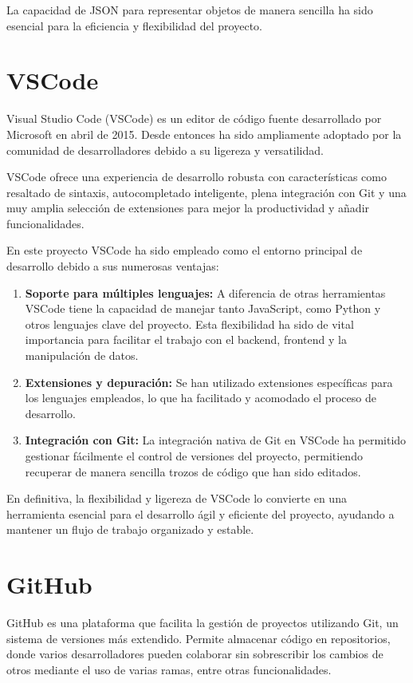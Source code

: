 \documentclass[a4paper, 12pt]{book}
\begin{document}
La capacidad de JSON para representar objetos de manera sencilla ha sido esencial para la eficiencia y flexibilidad del proyecto.

\section{VSCode}
Visual Studio Code (VSCode) es un editor de código fuente desarrollado por Microsoft en abril de 2015. Desde entonces ha sido ampliamente adoptado por la comunidad de desarrolladores debido a su ligereza y versatilidad.

VSCode ofrece una experiencia de desarrollo robusta con características como resaltado de sintaxis, autocompletado inteligente, plena integración con Git y una muy amplia selección de extensiones para mejor la productividad y añadir funcionalidades.

En este proyecto VSCode ha sido empleado como el entorno principal de desarrollo debido a sus numerosas ventajas:

\begin{enumerate}
    \item \textbf{Soporte para múltiples lenguajes: } A diferencia de otras herramientas VSCode tiene la capacidad de manejar tanto JavaScript, como Python y otros lenguajes clave del proyecto. Esta flexibilidad ha sido de vital importancia para facilitar el trabajo con el backend, frontend y la manipulación de datos.
    \item \textbf{Extensiones y depuración: } Se han utilizado extensiones específicas para los lenguajes empleados, lo que ha facilitado y acomodado el proceso de desarrollo.
    \item \textbf{Integración con Git: } La integración nativa de Git en VSCode ha permitido gestionar fácilmente el control de versiones del proyecto, permitiendo recuperar de manera sencilla trozos de código que han sido editados.
\end{enumerate}

En definitiva, la flexibilidad y ligereza de VSCode lo convierte en una herramienta esencial para el desarrollo ágil y eficiente del proyecto, ayudando a mantener un flujo de trabajo organizado y estable.

\section{GitHub}

GitHub es una plataforma que facilita la gestión de proyectos utilizando Git, un sistema de versiones más extendido. Permite almacenar código en repositorios, donde varios desarrolladores pueden colaborar sin sobrescribir los cambios de otros mediante el uso de varias ramas, entre otras funcionalidades. 
\end{document}
